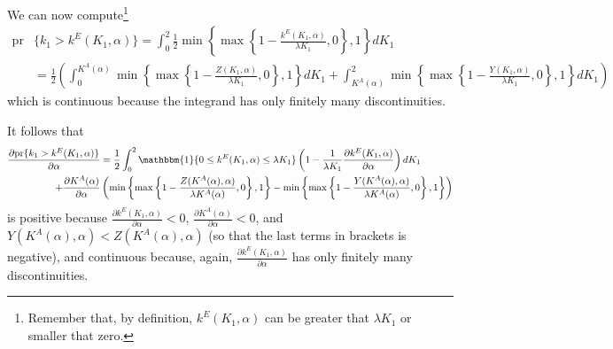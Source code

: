 \documentclass[12pt,american]{paper}
\theoremstyle{remark}
\begin{document}
We can now compute\footnote{Remember that, by definition, $k^E(K_1,\alpha)$ can be greater that $\lambda K_1$ or smaller that zero.}
{\footnotesize
\begin{align*}
\mbox{pr} & \{k_1>k^E(K_1,\alpha) \}  = \int_0^2 \frac{1}{2} \min \left\lbrace \max \left\lbrace 1-\frac{k^E(K_1,\alpha)}{\lambda K_1},0 \right\rbrace, 1 \right\rbrace dK_1
\\
&=\frac{1}{2} \left( \int_0^{K^A(\alpha)} \min \left\lbrace \max \left\lbrace 1-\frac{Z(K_1,\alpha)}{\lambda K_1},0 \right\rbrace,  1 \right\rbrace dK_1  + \int_{K^A(\alpha)}^2  \min \left\lbrace \max \left\lbrace 1-\frac{Y(K_1,\alpha)}{\lambda K_1},0 \right\rbrace,  1 \right\rbrace dK_1 \right)
\end{align*}}
which is continuous because the integrand has only finitely many discontinuities.

It follows that 
{\footnotesize
\begin{align*}
 \frac{\partial \mbox{pr}\{k_1>k^E(K_1,\alpha) \}}{\partial \alpha} & =  %
 \frac{1}{2} \int_0^2  \mathbbm{1}\{0\leq k^E(K_1,\alpha)\leq \lambda K_1\} \left( 1- \frac{1}{\lambda K_1} \frac{\partial k^E(K_1,\alpha)}{\partial \alpha} \right)  dK_1 \\  + \frac{\partial K^A(\alpha)}{\partial \alpha} & \left(   \min \left\lbrace \max \left\lbrace 1-\frac{Z(K^A(\alpha),\alpha)}{\lambda K^A(\alpha)},0 \right\rbrace,  1 \right\rbrace - \min \left\lbrace \max \left\lbrace 1-\frac{Y(K^A(\alpha),\alpha)}{\lambda K^A(\alpha)},0 \right\rbrace,  1 \right\rbrace \right) 
\end{align*}} 
is positive because $\frac{\partial k^E(K_1,\alpha)}{\partial \alpha}<0$, $\frac{\partial K^A(\alpha)}{\partial \alpha}<0$, and $Y(K^A(\alpha),\alpha)<Z(K^A(\alpha),\alpha)$ (so that the last terms in brackets is negative),  and continuous because, again, $\frac{\partial k^E(K_1,\alpha)}{\partial \alpha} $  has only finitely many discontinuities. %
\end{document}
